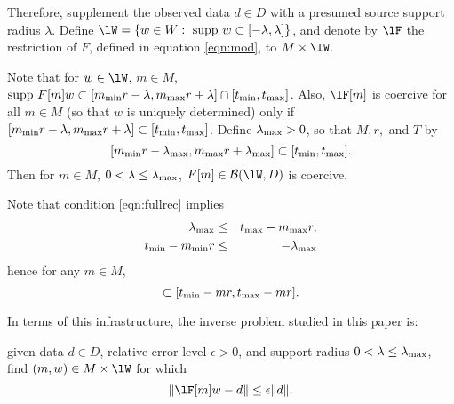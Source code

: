 Therefore, supplement the observed data $d \in D$ with a presumed 
source support radius $\lambda$. Define 
$\lW=\{w \in W: \mbox{ supp }w \subset [-\lambda,\lambda]\}$, and 
denote by $\lF$ the restriction of $F$, defined in equation 
\ref{eqn:mod}, to $M \times \lW$.

Note that for $w \in \lW$, $m \in M$,
$\mbox{supp }F[m]w \subset [ m_{\rm min}r-\lambda,
m_{\rm max}r+\lambda] \cap
[t_{\rm min},t_{\rm max}]$. Also, $\lF[m]$ is coercive for all $m \in
M$ (so that $w$ is uniquely determined) only if
$[ m_{\rm min}r-\lambda,m_{\rm max}r+\lambda] \subset
[t_{\rm min},t_{\rm max}]$. Define $\lambda_{\rm max}
>0$, so that $M, r,$ and $T$ by
\begin{equation}
  \label{eqn:fullrec}
  [ m_{\rm min}r-\lambda_{\rm max}, m_{\rm max}r+\lambda_{\rm max}]
  \subset [t_{\rm min},t_{\rm max}].
\end{equation}
Then for 
$m \in M$, $0 <\lambda \le \lambda_{\rm max}$, $F[m] \in {\cal B}(\lW,D)$ is coercive.

Note that condition \ref{eqn:fullrec} implies
\begin{eqnarray}
  \lambda_{\rm max} & \le & t_{\rm max}-m_{\rm max}r,\nonumber \\
  t_{\rm min}-m_{\rm min}r & \le & -\lambda_{\rm max} \label{eqn:lminc}
\end{eqnarray}
hence for any $m \in M$,
\begin{equation}
  [-\lambda_{\rm max}, -\lambda_{\rm max}] \subset[ t_{\rm min}-mr ,
  t_{\rm max}-mr].
  \label{eqn:zeroinc}
\end{equation}

In terms of this infrastructure, the inverse problem studied in 
this paper is: 

 given data $d \in D$, relative 
error level $\epsilon >0$, and support radius $0 <\lambda \le 
\lambda_{\rm max}$, find 
$(m,w) \in M \times \lW$ for which 
\begin{equation}
  \label{eqn:probstat0}
  \|\lF[m]w-d\| \le \epsilon\|d\|. 
\end{equation}


